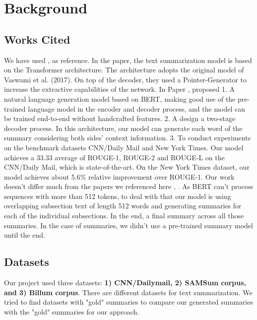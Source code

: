 \documentclass[twoside,twocolumn]{article}
\begin{document}

\section{Background}




\subsection{Works Cited}
We have used \cite{aksenov2020abstractive}, \cite{zhang2019pretraining} as reference. In the \cite{aksenov2020abstractive} paper, the 
text summarization model is based on the Transformer architecture. The architecture adopts the original model of Vaswami et al. (2017). 
On top of the decoder, they used a Pointer-Generator to increase the extractive capabilities of the network. In Paper \cite{zhang2019pretraining}, 
proposed 1. A natural language generation model based on BERT, making good use of the pre-trained language model in the encoder and decoder 
process, and the model can be trained end-to-end without handcrafted features. 2. A design a two-stage decoder process. In this architecture, 
our model can generate each word of the summary considering both sides’ context information. 3. To conduct experiments on the benchmark datasets 
CNN/Daily Mail and New York Times. Our model achieves a 33.33 average of ROUGE-1, ROUGE-2 and ROUGE-L on the CNN/Daily Mail, which is 
state-of-the-art. On the New York Times dataset, our model achieves about 5.6\% relative improvement over ROUGE-1. 
Our work doesn't differ much from the papers we referenced here \cite{aksenov2020abstractive}, \cite{zhang2019pretraining}. As BERT can't 
process sequences with more than 512 tokens, to deal with that our model is using overlapping subsection text of length 512 words and generating 
summaries for each of the individual subsections. In the end, a final summary across all those summaries. In the case of summaries, we didn't 
use a pre-trained summary model until the end.



\subsection{Datasets}

Our project used three datasets: \textbf{1) CNN/Dailymail, 2) SAMSum corpus, and 3) Billum corpus}. There are different datasets for text 
summarization. We tried to find datasets with "gold" summaries to compare our generated summaries with the "gold" summaries for our approach.\par 
\end{document}
